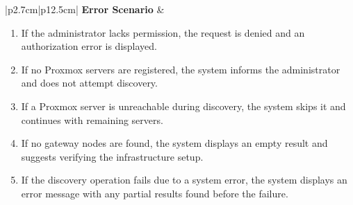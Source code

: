 \begin{table}[H]
\begin{tabular}{|p{2.7cm}|p{12.5cm}|}
\textbf{Error Scenario} & 
\begin{minipage}[t]{\linewidth}
\begin{enumerate}[topsep=0pt,itemsep=1pt,parsep=0pt,partopsep=0pt]
\item If the administrator lacks permission, the request is denied and an authorization error is displayed.
\item If no Proxmox servers are registered, the system informs the administrator and does not attempt discovery.
\item If a Proxmox server is unreachable during discovery, the system skips it and continues with remaining servers.
\item If no gateway nodes are found, the system displays an empty result and suggests verifying the infrastructure setup.
\item If the discovery operation fails due to a system error, the system displays an error message with any partial results found before the failure.
\end{enumerate}
\end{minipage} \\ \hline

\end{tabular}
\label{tab:admin-discover-gateway-nodes}
\end{table}


